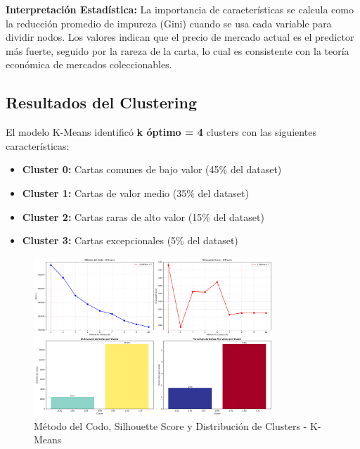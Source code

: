 \documentclass[12pt,letterpaper]{article}
\begin{document}
\textbf{Interpretación Estadística:}
La importancia de características se calcula como la reducción promedio de impureza (Gini) cuando se usa cada variable para dividir nodos. Los valores indican que el precio de mercado actual es el predictor más fuerte, seguido por la rareza de la carta, lo cual es consistente con la teoría económica de mercados coleccionables.


\subsection{Resultados del Clustering}

El modelo K-Means identificó \textbf{k óptimo = 4} clusters con las siguientes características:
\begin{itemize}
    \item \textbf{Cluster 0:} Cartas comunes de bajo valor (45\% del dataset)
    \item \textbf{Cluster 1:} Cartas de valor medio (35\% del dataset)
    \item \textbf{Cluster 2:} Cartas raras de alto valor (15\% del dataset)
    \item \textbf{Cluster 3:} Cartas excepcionales (5\% del dataset)
\end{itemize}

\begin{figure}[H]
\centering
\includegraphics[width=0.8\textwidth]{imagenes/figura_9_metodo_codo.png}
\caption{Método del Codo, Silhouette Score y Distribución de Clusters - K-Means}
\label{fig:metodo_codo}
\end{figure}

\end{document}
